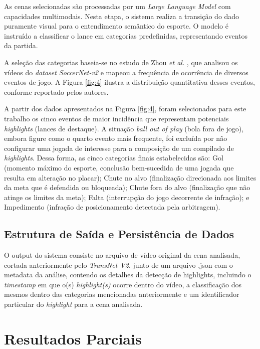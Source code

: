 \documentclass[a4paper,10pt, twocolumn]{article}
\begin{document}
As cenas selecionadas são processadas por um \textit{Large Language Model} com capacidades multimodais. Nesta etapa, o sistema realiza a transição do dado puramente visual para o entendimento semântico do esporte. O modelo é instruído a classificar o lance em categorias predefinidas, representando eventos da partida.

A seleção das categorias baseia-se no estudo de Zhou \textit{et al.} \cite{zhou2021feature}, que analisou os vídeos do \textit{dataset SoccerNet-v2} e mapeou a frequência de ocorrência de diversos eventos de jogo. A Figura \ref{fig:4} ilustra a distribuição quantitativa desses eventos, conforme reportado pelos autores.

A partir dos dados apresentados na Figura \ref{fig:4}, foram selecionados para este trabalho os cinco eventos de maior incidência que representam potenciais \textit{highlights} (lances de destaque). A situação \textit{ball out of play} (bola fora de jogo), embora figure como o quarto evento mais frequente, foi excluída por não configurar uma jogada de interesse para a composição de um compilado de \textit{highlights}. Dessa forma, as cinco categorias finais estabelecidas são: Gol (momento máximo do esporte, conclusão bem-sucedida de uma jogada que resulta em alteração no placar); Chute no alvo (finalização direcionada aos limites da meta que é defendida ou bloqueada); Chute fora do alvo (finalização que não atinge os limites da meta); Falta (interrupção do jogo decorrente de infração); e Impedimento (infração de posicionamento detectada pela arbitragem).

\subsection{Estrutura de Saída e Persistência de Dados}

O output do sistema consiste no arquivo de vídeo original da cena analisada, cortada anteriormente pelo \textit{TransNet V2}, junto de um arquivo .json com o metadata da análise, contendo os detalhes da detecção de highlights, incluindo o \textit{timestamp} em que o(s) \textit{highlight(s)} ocorre dentro do vídeo, a classificação dos mesmos dentro das categorias mencionadas anteriormente e um identificador particular do \textit{highlight} para a cena analisada.

\section{Resultados Parciais}
\end{document}
